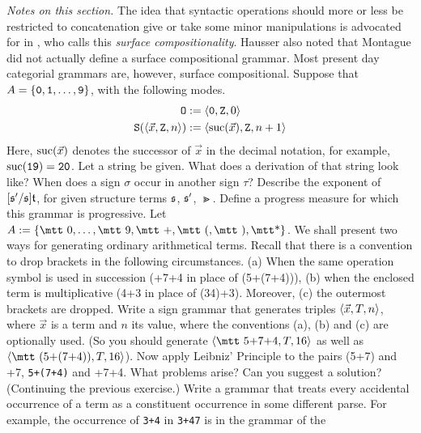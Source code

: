{\it Notes on this section.} The idea that syntactic operations should 
more or less be restricted to concatenation give or take some minor 
manipulations is advocated for in \cite{hausser:surface}, who calls 
this {\it surface compositionality}. Hausser also noted that Montague 
did not actually define a surface compositional grammar. Most present 
day categorial grammars are, however, surface compositional.  
\vplatz
\exercise
Suppose that $A = \{\mbox{\tt 0}, \mbox{\tt 1}, \dotsc, \mbox{\tt 9}\}$,
with the following modes.
\begin{align}
\mbox{\tt O} & := \langle \mbox{\tt 0}, \mbox{\tt Z}, 0\rangle \\
\mbox{\tt S}(\langle \vec{x}, \mbox{\tt Z}, n\rangle) &
    := \langle \operatorname{suc}(\vec{x}), \mbox{\tt Z}, n+1\rangle
\end{align}
Here, $\operatorname{suc}(\vec{x})$ denotes the successor of $\vec{x}$ in the decimal
notation, for example, $\operatorname{suc}(\mbox{\tt 19}) = \mbox{\tt 20}$. Let a
string be given. What does a derivation of that string look like?
When does a sign $\sigma$ occur in another sign $\tau$? Describe
the exponent of $[\mathfrak{s}'/\mathfrak{s}]\mathfrak{t}$, for given structure terms
$\mathfrak{s}$, $\mathfrak{s}'$, $\Gt$. Define a progress measure for which this 
grammar is progressive.
\vplatz
\exercise
Let $A := \{\mbox{\mtt 0}, \dotsc, \mbox{\mtt 9}, \mbox{\mtt +},
\mbox{\mtt (}, \mbox{\mtt )}, \mbox{\mtt\symbol{42}}\}$. We shall 
present two ways for generating ordinary arithmetical terms. Recall that
there is a convention to drop brackets in the following
circumstances. (a) When the same operation symbol is used in
succession ({+7+4} in place of {\mtt (5+(7+4))}),
(b) when the enclosed term is multiplicative ({4+3}
in place of {\mtt (34)+3}). Moreover, (c) the outermost
brackets are dropped. Write a sign grammar that generates triples
$\langle \vec{x}, T, n\rangle$, where $\vec{x}$ is a term and $n$ its
value, where the conventions (a), (b) and (c) are optionally used.
(So you should generate $\auf \mbox{\mtt 5+7+4}, T, 16\zu$ as well as
$\auf \mbox{\mtt (5+(7+4))}, T, 16\zu$). Now apply Leibniz' Principle
to the pairs {\mtt (5+7)} and {+7}, {\tt 5+(7+4)} and
{+7+4}. What problems arise? Can you suggest a solution?
\vplatz
\exercise
(Continuing the previous exercise.) Write a grammar that treats
every accidental occurrence of a term as a constituent occurrence
in some different parse. For example, the occurrence of {\tt 3+4}
in {\tt 3+47} is in the grammar of the
